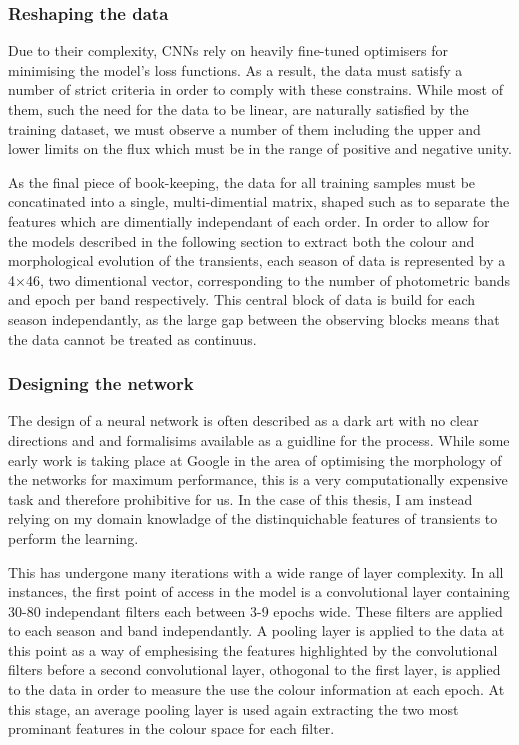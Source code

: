 \subsubsection{Reshaping the data}
Due to their complexity, CNNs rely on heavily fine-tuned optimisers for minimising the model's loss functions. As a result, the data must satisfy a number of strict criteria in order to comply with these constrains. While most of them, such the need for the data to be linear, are naturally satisfied by the training dataset, we must observe a number of them including the upper and lower limits on the flux which must be in the range of positive and negative unity.

As the final piece of book-keeping, the data for all training samples must be concatinated into a single, multi-dimential matrix, shaped such as to separate the features which are dimentially independant of each order. In order to allow for the models described in the following section to extract both the colour and morphological evolution of the transients, each season of data is represented by a 4$\times$46, two dimentional vector, corresponding to the number of photometric bands and epoch per band respectively. This central block of data is build for each season independantly, as the large gap between the observing blocks means that the data cannot be treated as continuus.

\subsubsection{Designing the network} \label{sec:AGNNoiseModel}
The design of a neural network is often described as a dark art with no clear directions and and formalisims available as a guidline for the process. While some early work is taking place at Google in the area of optimising the morphology of the networks for maximum performance, this is a very computationally expensive task and therefore prohibitive for us. In the case of this thesis, I am instead relying on my domain knowladge of the distinquichable features of transients to perform the learning.

This has undergone many iterations with a wide range of layer complexity. In all instances, the first point of access in the model is a convolutional layer containing 30-80 independant filters each between 3-9 epochs wide. These filters are applied to each season and band independantly. A pooling layer is applied to the data at this point as a way of emphesising the features highlighted by the convolutional filters before a second convolutional layer, othogonal to the first layer, is applied to the data in order to measure the use the colour information at each epoch. At this stage, an average pooling layer is used again extracting the two most prominant features in the colour space for each filter.

